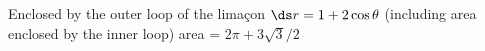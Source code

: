 {Enclosed by the outer loop of the lima\c con $\ds r=1+2\cos \theta$ (including area enclosed by the inner loop)}
{area = $2\pi+3\sqrt{3}/2$
}
